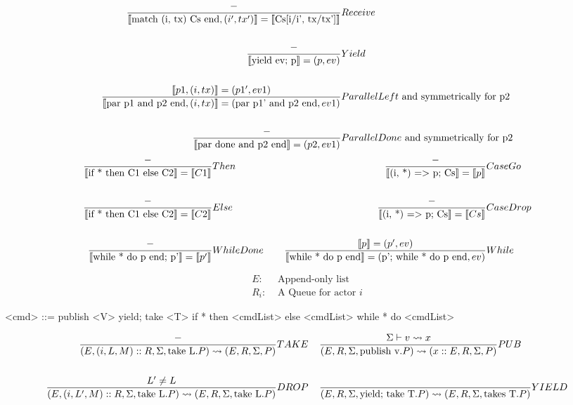 \documentclass[acmsmall,review,anonymous]{acmart}\settopmatter{printfolios=true}
\begin{document}
\begin{align*}
\judge{&Receive}{
	-
}{
	\semfunc[\text{match (i, tx) Cs end}, (i', tx')] = \semfunc[\text{Cs[i/i', tx/tx']}]  %
}\\
\\
\judge{&Yield}{
	-
}{
	\semfunc[\text{yield ev; p}] = (p, ev)  %
}\\
\\
\judge{&ParallelLeft\text{ and symmetrically for p2}}{  %
	\semfunc[p1, (i, tx)] = (p1', ev1)
}{
	\semfunc[\text{par p1 and p2 end}, (i, tx)] = (\text{par p1' and p2 end}, ev1)
}\\
\\
\judge{&ParallelDone\text{ and symmetrically for p2}}{
    -
}{
	\semfunc[\text{par done and p2 end}] = (p2, ev1)
}
\end{align*}
\begin{align*}
\judge{&Then}{
	-
}{
	\semfunc[\text{if * then C1 else C2}] = \semfunc[C1]
}& \;\;\;\;
\judge{&CaseGo}{
	- %
}{
	\semfunc[\text{(i, *) => p; Cs}] = \semfunc[p]
}\\
\\
\judge{&Else}{
	-
}{
	\semfunc[\text{if * then C1 else C2}] = \semfunc[C2]
}& \;\;\;\;
\judge{&CaseDrop}{
	-
}{
	\semfunc[\text{(i, *) => p; Cs}] = \semfunc[Cs]
}\\
\\
\judge{&WhileDone}{
	-
}{
	\semfunc[\text{while * do p end; p'}] = \semfunc[p']
}& \;\;\;\;
\judge{&While}{
	\semfunc[p] = (p', ev)
}{
	\semfunc[\text{while * do p end}] = (\text{p'; while * do p end}, ev)
}
\end{align*}

\vfill
\pagebreak




\begin{align*}
	E :& \text{ Append-only list} \\
    R_i :& \text{ A Queue for actor } i
\end{align*}

\begin{grammar}
	<cmd> ::= publish <V>
         \alt yield; take <T>
         \alt if * then <cmdList> else <cmdList>
         \alt while * do <cmdList>
\end{grammar}


\begin{align*}
\judge{TAKE}{
	-
}{
	(E, (i, L, M)::R, \Sigma, \text{take L}.P) \reduce (E, R, \Sigma, P)
}& \;\;\;\;
\judge{PUB}{
	\Sigma \vdash v \reduce x
}{
	(E, R, \Sigma, \text{publish v}.P)\reduce (x::E, R, \Sigma, P)
}\\
\\
\judge{DROP}{
	L' \neq L
}{
	(E, (i, L', M)::R, \Sigma, \text{take L}.P) \reduce (E, R, \Sigma, \text{take L}.P)
} & \;\;\;\;
\judge{YIELD}{
	 \;
}{
	(E, R, \Sigma, \text{yield; take T}.P) \reduce (E, R, \Sigma, \text{takes T}.P)
}
\end{align*}
\end{document}

